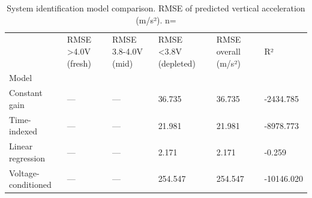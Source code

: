 \begin{table}
\caption{System identification model comparison. RMSE of predicted vertical acceleration (m/s²). n={}}
\label{tab:sysid}
\begin{tabular}{llllll}
\toprule
 & RMSE >4.0V (fresh) & RMSE 3.8-4.0V (mid) & RMSE <3.8V (depleted) & RMSE overall (m/s²) & R² \\
Model &  &  &  &  &  \\
\midrule
Constant gain & — & — & 36.735 & 36.735 & -2434.785 \\
Time-indexed & — & — & 21.981 & 21.981 & -8978.773 \\
Linear regression & — & — & 2.171 & 2.171 & -0.259 \\
Voltage-conditioned & — & — & 254.547 & 254.547 & -10146.020 \\
\bottomrule
\end{tabular}
\end{table}
